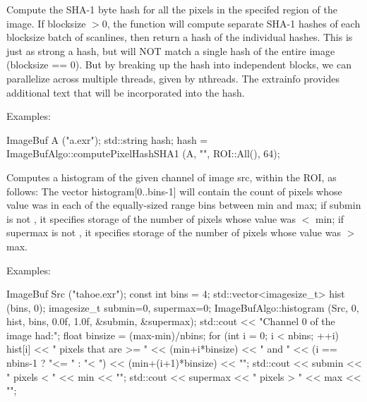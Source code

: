  

Compute the SHA-1 byte hash for all the pixels in the specifed region of
the image.  If {\cf blocksize} $> 0$, the function will compute separate
SHA-1 hashes of each {\cf blocksize} batch of scanlines, then return a
hash of the individual hashes.  This is just as strong a hash, but will
NOT match a single hash of the entire image ({\cf blocksize == 0}).  But
by breaking up the hash into independent blocks, we can parallelize
across multiple threads, given by {\cf nthreads}.
The {\cf extrainfo} provides additional text that will be
incorporated into the hash.

\smallskip
\noindent Examples:
\begin{code}
    ImageBuf A ("a.exr");
    std::string hash;
    hash = ImageBufAlgo::computePixelHashSHA1 (A, "", ROI::All(), 64);
\end{code}
\apiend

 
Computes a histogram of the given {\cf channel} of image {\cf src},
within the ROI,
as follows: The vector {\cf histogram[0..bins-1]} will contain the
count of pixels whose value was in each of the equally-sized range
bins between {\cf min} and {\cf max}; if {\cf submin} is not \NULL,
it specifies storage of the number of pixels whose value was
$<$ {\cf min}; if {\cf supermax} is not \NULL, it specifies storage of
the number of pixels whose value was $>$ {\cf max}.

\smallskip
\noindent Examples:
\begin{code}
    ImageBuf Src ("tahoe.exr");
    const int bins = 4;
    std::vector<imagesize_t> hist (bins, 0);
    imagesize_t submin=0, supermax=0;
    ImageBufAlgo::histogram (Src, 0, hist, bins, 0.0f, 1.0f,
                             &submin, &supermax);
    std::cout << "Channel 0 of the image had:\n";
    float binsize = (max-min)/nbins;
    for (int i = 0;  i < nbins;  ++i)
        hist[i] << " pixels that are >= " << (min+i*binsize) << " and "
                << (i == nbins-1 ? "<= " : "< ")
                << (min+(i+1)*binsize) << "\n";
    std::cout << submin << " pixels < " << min << "\n";
    std::cout << supermax << " pixels > " << max << "\n";
\end{code}
\apiend


